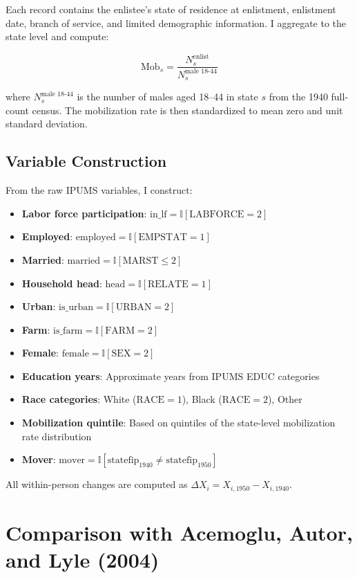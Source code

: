 \documentclass[12pt]{article}
\newcommand{\ind}{\mathbb{I}}
\begin{document}
Each record contains the enlistee's state of residence at enlistment, enlistment date, branch of service, and limited demographic information. I aggregate to the state level and compute:

\begin{equation}
\text{Mob}_s = \frac{N_s^{\text{enlist}}}{N_s^{\text{male 18-44}}}
\end{equation}

\noindent where $N_s^{\text{male 18-44}}$ is the number of males aged 18--44 in state $s$ from the 1940 full-count census. The mobilization rate is then standardized to mean zero and unit standard deviation.

\subsection{Variable Construction}

From the raw IPUMS variables, I construct:

\begin{itemize}
\item \textbf{Labor force participation}: $\text{in\_lf} = \ind[\text{LABFORCE} = 2]$
\item \textbf{Employed}: $\text{employed} = \ind[\text{EMPSTAT} = 1]$
\item \textbf{Married}: $\text{married} = \ind[\text{MARST} \leq 2]$
\item \textbf{Household head}: $\text{head} = \ind[\text{RELATE} = 1]$
\item \textbf{Urban}: $\text{is\_urban} = \ind[\text{URBAN} = 2]$
\item \textbf{Farm}: $\text{is\_farm} = \ind[\text{FARM} = 2]$
\item \textbf{Female}: $\text{female} = \ind[\text{SEX} = 2]$
\item \textbf{Education years}: Approximate years from IPUMS EDUC categories
\item \textbf{Race categories}: White ($\text{RACE} = 1$), Black ($\text{RACE} = 2$), Other
\item \textbf{Mobilization quintile}: Based on quintiles of the state-level mobilization rate distribution
\item \textbf{Mover}: $\text{mover} = \ind[\text{statefip}_{1940} \neq \text{statefip}_{1950}]$
\end{itemize}

All within-person changes are computed as $\Delta X_i = X_{i,1950} - X_{i,1940}$.


\section{Comparison with Acemoglu, Autor, and Lyle (2004)}
\label{app:comparison}
\end{document}
